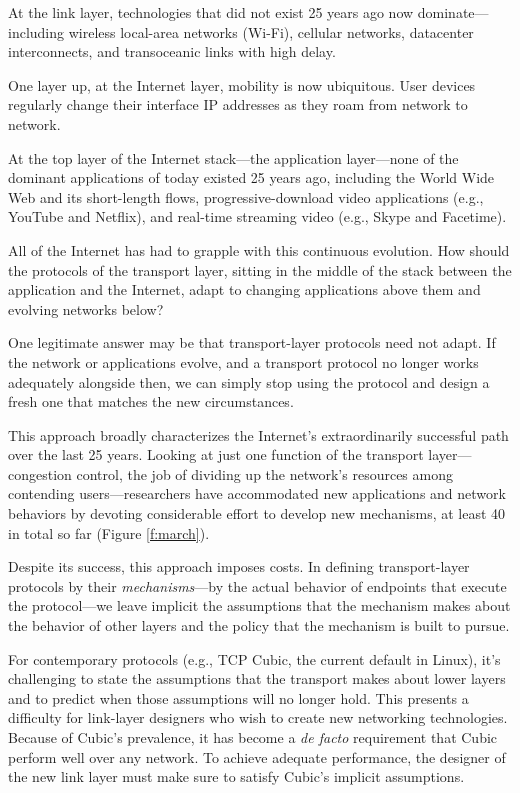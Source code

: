 At the link layer, technologies that did not exist 25 years
ago now dominate---including wireless local-area networks (Wi-Fi),
cellular networks, datacenter interconnects, and transoceanic links
with high delay.

One layer up, at the Internet layer, mobility is now
ubiquitous. User devices regularly change their interface IP addresses
as they roam from network to network.

At the top layer of the Internet stack---the application
layer---none of the dominant applications of today existed 25 years
ago, including the World Wide Web and its short-length flows,
progressive-download video applications (e.g., YouTube and Netflix),
and real-time streaming video (e.g., Skype and Facetime).

All of the Internet has had to grapple with this continuous
evolution. How should the protocols of the transport layer,
sitting in the middle of the stack between the application and the
Internet, adapt to changing applications above them and
evolving networks below?

One legitimate answer may be that transport-layer protocols need not
adapt. If the network or applications evolve, and a transport
protocol no longer works adequately alongside then, we can simply stop
using the protocol and design a fresh one that matches the new
circumstances.

This approach broadly characterizes the Internet's extraordinarily
successful path over the last 25 years. Looking at just one
function of the transport layer---congestion control, the job of
dividing up the network's resources among contending
users---researchers have accommodated new applications and network
behaviors by devoting considerable effort to develop new
mechanisms, at least 40 in total so far (Figure \ref{f:march}).

Despite its success, this approach imposes costs. In defining
transport-layer protocols by their \emph{mechanisms}---by the actual
behavior of endpoints that execute the protocol---we leave implicit
the assumptions that the mechanism makes about the behavior of other
layers and the policy that the mechanism is built to pursue.

For contemporary protocols (e.g., TCP Cubic, the current default in
Linux), it's challenging to state the assumptions that the transport
makes about lower layers and to predict when those assumptions will no
longer hold. This presents a difficulty for link-layer designers who
wish to create new networking technologies. Because of Cubic's
prevalence, it has become a \emph{de facto} requirement that Cubic
perform well over any network. To achieve adequate performance, the
designer of the new link layer must make sure to satisfy Cubic's
implicit assumptions.

